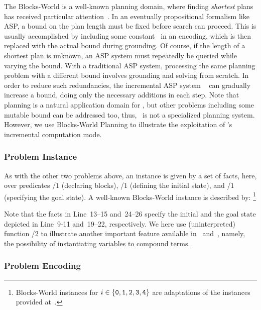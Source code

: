 The Blocks-World is a well-known planning domain,
where finding \emph{shortest} plans has received particular attention~\cite{gupnau92a}.
In an eventually propositional formalism like ASP,
a bound on the plan length must be fixed before search can proceed.
This is usually accomplished by including some constant~
in an encoding, which is then replaced with the actual bound during grounding.
Of course, if the length of a shortest plan is unknown,
an ASP system must repeatedly be queried while varying the bound.
With a traditional ASP system, processing
the same planning problem with a different bound
involves grounding and solving from scratch.
\tbr
In order to reduce such redundancies,
the incremental ASP system \iclingo~\cite{gekakaosscth08a}
can gradually increase a bound, %
doing only the necessary additions in each step.
Note that planning is a natural application domain for \iclingo,
but other problems including some mutable bound can be addressed too, thus,
\iclingo\ is not a specialized planning system.
However, we use Blocks-World Planning to illustrate the exploitation of
\iclingo's incremental computation mode.


\subsubsection{Problem Instance}\label{subsec:block:instance}

As with the other two problems above,
an instance is given by a set of facts, here,
over predicates /$1$ (declaring blocks),
/$1$ (defining the initial state), and
/$1$ (specifying the goal state).
A well-known Blocks-World instance is described by:%
\footnote{%
  Blocks-World instances  for $i\in\{\texttt{0},\texttt{1},\texttt{2},\texttt{3},\texttt{4}\}$
  are adaptations of the instances provided at~\cite{erdemBW}.}
%

%
Note that the facts in Line~13--15 and~24--26 specify the initial
and the goal state depicted in Line~9-11 and~19--22, respectively.
We here use (uninterpreted) function /$2$ to illustrate another
important feature available in \gringo\ and~\clingo, namely,
the possibility of instantiating variables to compound terms.


\subsubsection{Problem Encoding}\label{subsec:block:encoding}

